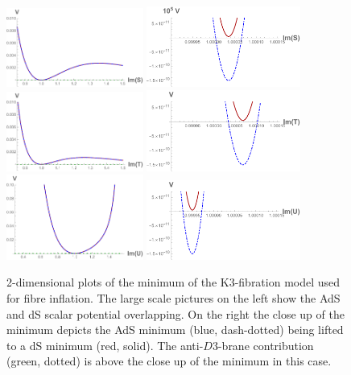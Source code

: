 \documentclass[a4paper,12pt]{report}
\begin{document}
\begin{figure}[H]
     \centering
     \includegraphics[width=0.4\textwidth]{fibreSLarge.pdf} \hspace{20pt} \includegraphics[width=0.45\textwidth]{fibreSClose.pdf}\\
     \includegraphics[width=0.4\textwidth]{fibreTLarge.pdf} \hspace{20pt} \includegraphics[width=0.45\textwidth]{fibreTClose.pdf}\\
     \includegraphics[width=0.4\textwidth]{fibreULarge.pdf} \hspace{20pt} \includegraphics[width=0.45\textwidth]{fibreUClose.pdf}
\caption{2-dimensional plots of the minimum of the K3-fibration model used for fibre inflation. The large scale pictures on the left show the AdS and dS scalar potential overlapping. On the right the close up of the minimum depicts the AdS minimum (blue, dash-dotted) being lifted to a dS minimum (red, solid). The anti-$D3$-brane contribution (green, dotted) is above the close up of the minimum in this case. }
\label{fig:fibre2d}
\end{figure}
\end{document}
